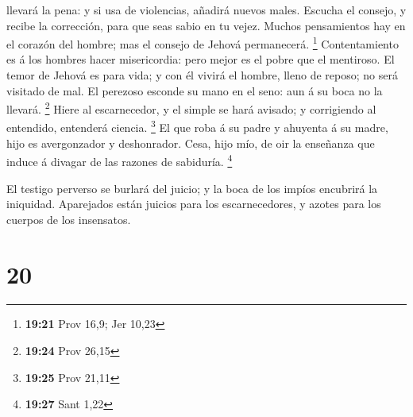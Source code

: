 llevará la pena: y si usa de violencias, añadirá nuevos males.
 Escucha el consejo, y recibe la corrección, para que seas
sabio en tu vejez.  Muchos pensamientos hay en el corazón
del hombre; mas el consejo de Jehová permanecerá. \footnote{\textbf{19:21}
  Prov 16,9; Jer 10,23}  Contentamiento es á los hombres
hacer misericordia: pero mejor es el pobre que el mentiroso.
 El temor de Jehová es para vida; y con él vivirá el
hombre, lleno de reposo; no será visitado de mal.  El
perezoso esconde su mano en el seno: aun á su boca no la llevará.
\footnote{\textbf{19:24} Prov 26,15}  Hiere al
escarnecedor, y el simple se hará avisado; y corrigiendo al entendido,
entenderá ciencia. \footnote{\textbf{19:25} Prov 21,11}  El
que roba á su padre y ahuyenta á su madre, hijo es avergonzador y
deshonrador.  Cesa, hijo mío, de oir la enseñanza que
induce á divagar de las razones de sabiduría. \footnote{\textbf{19:27}
  Sant 1,22}

 El testigo perverso se burlará del juicio; y la boca de
los impíos encubrirá la iniquidad.  Aparejados están
juicios para los escarnecedores, y azotes para los cuerpos de los
insensatos.

\hypertarget{section-19}{%
\section{20}\label{section-19}}

